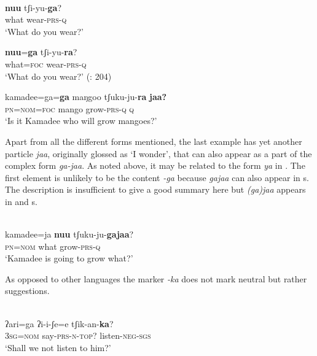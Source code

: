 \ea%
    \label{ex:japa:29}
    \\
    \ea
    \gll \textbf{{nuu}} tʃi-yu-\textbf{{ga}}?\\
    what  wear-\textsc{prs}-\textsc{q}\\
    \glt ‘What do you wear?’
    
    \ex
    \gll \textbf{{nuu}}=\textbf{{ga}} tʃi-yu-\textbf{{ra}}?\\
    what=\textsc{foc}  wear-\textsc{prs}-\textsc{q}\\
    \glt ‘What do you wear?’ (\citealt{Nagano-Madsen2015}: 204)
    
    \ex
    \gll kamadee=ga=\textbf{{ga}} maŋgoo    tʃuku-ju-\textbf{{ra}} \textbf{{jaa?}}\\
    \textsc{pn}=\textsc{nom}=\textsc{foc}    mango    grow-\textsc{prs}-\textsc{q}  \textsc{q}\\
    \glt ‘Is it Kamadee who will grow mangoes?’ \citep[394]{Miyara2015}
    \z
    \z 

\noindent Apart from all the different forms mentioned, the last example has yet another particle \textit{jaa}, originally glossed as ‘I wonder’, that can also appear as a part of the complex form \textit{ga-jaa}. As noted above, it may be related to the form \textit{ya} in . The first element is unlikely to be the content  \textit{-ga} because \textit{gajaa} can also appear in s. The description is insufficient to give a good summary here but \textit{(ga)jaa} appears in  and s.

\ea%
    \label{ex:japa:30}
    \\
    \gll kamadee=ja \textbf{{nuu}} tʃuku-ju-\textbf{{gajaa}}?\\
    \textsc{pn}=\textsc{nom}  what  grow-\textsc{prs}-\textsc{q}\\
    \glt ‘Kamadee is going to grow what?’ \citep[395]{Miyara2015}
    \z

As opposed to other  languages the marker \textit{-ka} does not mark neutral  but rather suggestions.

\ea%
    \label{ex:japa:31}
    \\
    \gll ʔari=ga  ʔi-i-ʃe=e    tʃik-an-\textbf{{ka}}?\\
    3\textsc{sg}=\textsc{nom}  say-\textsc{prs}-\textsc{n}-\textsc{top}?  listen-\textsc{neg}-\textsc{sgs}\\
    \glt ‘Shall we not listen to him?’ \citep[395]{Miyara2015}
    \z

